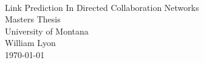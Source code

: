 




 


 \begin{titlepage}
 	\mbox{}\vspace{5\baselineskip}\\
 	\sffamily\huge
 	\centering
 	Link Prediction In Directed Collaboration Networks
 	\vspace{3\baselineskip}\\
 	\rmfamily\Large
 	Masters Thesis \\ University of Montana
 	\vspace{2\baselineskip}\\
 	\rmfamily\Large
 	William Lyon
 	\vspace{1\baselineskip}\\
 	\today
 \end{titlepage}

% 

